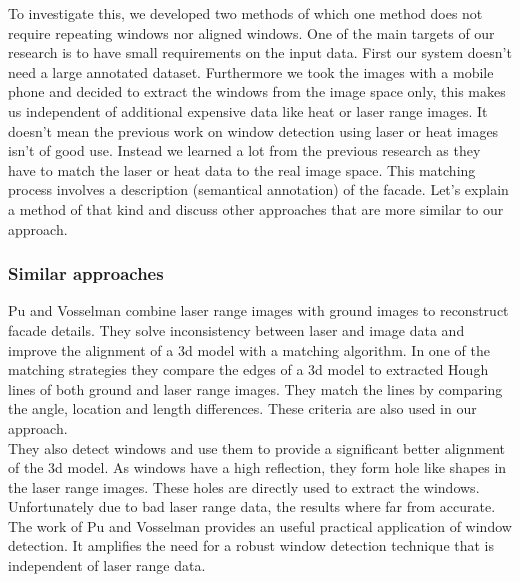 
To investigate this, we developed two methods of which one method does not
require repeating windows nor aligned windows.  One of the main targets of our research
is to have small requirements on the input data.  First our system doesn't need 
a large annotated dataset. Furthermore we took the images with a mobile phone
and decided to extract the windows from the image space only, this makes us
independent of additional expensive data like heat or laser range images.
It doesn't mean the previous work on window detection using laser or heat
images isn't of good use.  Instead we learned a lot from the previous research
as they have to match the laser or heat data to the real image space.  This
matching process involves a description (semantical annotation) of the facade.
Let's explain a method of that kind and discuss other approaches that are more
similar to our approach.\\

\subsubsection{Similar approaches}
Pu and Vosselman \cite{Pu_refiningbuilding} combine laser range images with
ground images to reconstruct facade details.  They solve inconsistency between
laser and image data and improve the alignment of a 3d model with a matching
algorithm.  In one of the matching strategies they compare the edges of a 3d
model to extracted Hough lines of both ground and laser range images.  They
match the lines by comparing the angle, location and length differences. These
criteria are also used in our approach.\\

They also detect windows and use them to provide a significant better alignment
of the 3d model.  As windows have a high reflection, they form hole like shapes
in the laser range images.  These holes are directly used to extract the
windows. Unfortunately due to bad laser range data, the results where far from
accurate.\\

The work of Pu and Vosselman \cite{Pu_refiningbuilding} provides an useful
practical application of window detection. It amplifies the need for a robust
window detection technique that is independent of laser range data.\\


